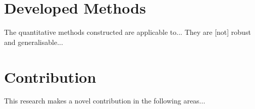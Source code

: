 \section{Developed Methods}
The quantitative methods constructed are applicable to...
They are [not] robust and generalisable...



\section{Contribution}
This research makes a novel contribution in the following areas...



